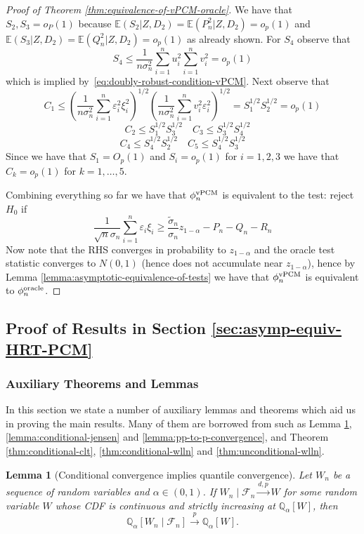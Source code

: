 \documentclass[12pt]{article}
\newtheorem{lemma}{Lemma}
\theoremstyle{definition}
\theoremstyle{remark}
\newcommand{\E}{\mathbb E}								%
\newcommand{\srz}{Z}									%
\begin{document}
\begin{proof}[Proof of Theorem \ref{thm:equivalence-of-vPCM-oracle}]
	We have that $S_2,S_3 =o_P(1)$ because $\E(S_2| \srz,D_2) =\E(P_n^2| \srz,D_2)= o_p(1)$ and $\E(S_3| \srz,D_2) = \E(Q_n^2| \srz,D_2)= o_p(1)$ as already shown. For $S_4$ observe that 
	$$
	S_4 \leq \frac{1}{n \sigma_n^2} \sum_{i=1}^n u_i^2 \sum_{i=1}^n v_i^2 = o_p(1)
	$$
	which is implied by~\eqref{eq:doubly-robust-condition-vPCM}.
	Next observe that 
	$$
	C_1 \leq \left(\frac{1}{n \sigma_n^2} \sum_{i=1}^n \varepsilon_i^2\xi_i^2 \right)^{1/2}\left(\frac{1}{n \sigma_n^2} \sum_{i=1}^n  v^2_i \varepsilon^2_i \right)^{1/2} = S_1^{1/2} S_2^{1/2} = o_p(1)
	$$
	$$
	\quad C_2 \leq S_1^{1/2} S_3^{1/2} \quad C_3 \leq S_3^{1/2}S_4^{1/2}
	$$
	$$
	C_4 \leq S_4^{1/2}S_2^{1/2} \quad C_5 \leq S_4^{1/2} S_3^{1/2}
	$$
	Since we have that $S_1 =O_p(1)$ and $S_i = o_p(1)$ for $i=1,2,3$ we have that $C_k = o_p(1)$ for $k = 1,\ldots,5$.
	
	Combining everything so far we have that $\phi^{\textnormal{vPCM}}_n$ is equivalent to the test: reject $H_0$ if
	$$
	\frac{1}{\sqrt n\sigma_n} \sum_{i=1}^n \varepsilon_i\xi_i \geq \frac{\widetilde \sigma_n}{\sigma_n}z_{1-\alpha} -P_n -Q_n - R_n
	$$
	Now note that the RHS converges in probability to $z_{1-\alpha}$ and the oracle test statistic converges to $N(0,1)$ (hence does not accumulate near $z_{1-\alpha}$), hence by Lemma \ref{lemma:asymptotic-equivalence-of-tests} we have that $\phi^{\textnormal{vPCM}}_n$ is equivalent to $\phi^{\textnormal{oracle}}_n$. 
\end{proof}

\subsection{Proof of Results in Section	\ref{sec:asymp-equiv-HRT-PCM}}
\subsubsection{Auxiliary Theorems and Lemmas}
In this section we state a number of auxiliary lemmas and theorems which aid us in proving the main results. Many of them are borrowed from \citet{Niu2022} such as Lemma \ref{lemma:conditional-convergence-to-quantile-convergence}, \ref{lemma:conditional-jensen} and \ref{lemma:pp-to-p-convergence}, and Theorem \ref{thm:conditional-clt}, \ref{thm:conditional-wlln} and \ref{thm:unconditional-wlln}.
\begin{lemma}[Conditional convergence implies quantile convergence] \label{lemma:conditional-convergence-to-quantile-convergence}
	Let $W_n$ be a sequence of random variables and $\alpha \in(0,1)$. If $W_n \mid \mathcal{F}_n \xrightarrow{d, p} W$ for some random variable $W$ whose CDF is continuous and strictly increasing at $\mathbb{Q}_\alpha[W]$, then
	$$
	\mathbb{Q}_\alpha\left[W_n \mid \mathcal{F}_n\right] \stackrel{p}{\rightarrow} \mathbb{Q}_\alpha[W] .
	$$
\end{lemma}
\end{document}
